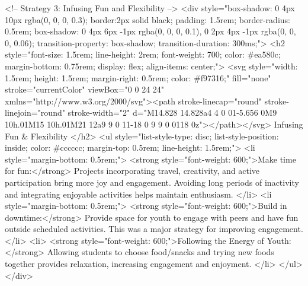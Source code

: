                 <!-- Strategy 3: Infusing Fun and Flexibility -->
                <div style="box-shadow: 0 4px 10px rgba(0, 0, 0, 0.3); border:2px solid black; padding: 1.5rem; border-radius: 0.5rem; box-shadow: 0 4px 6px -1px rgba(0, 0, 0, 0.1), 0 2px 4px -1px rgba(0, 0, 0, 0.06); transition-property: box-shadow; transition-duration: 300ms;">
                    <h2 style="font-size: 1.5rem; line-height: 2rem; font-weight: 700; color: #ea580c; margin-bottom: 0.75rem; display: flex; align-items: center;">
                        <svg style="width: 1.5rem; height: 1.5rem; margin-right: 0.5rem; color: #f97316;" fill="none" stroke="currentColor" viewBox="0 0 24 24" xmlns="http://www.w3.org/2000/svg"><path stroke-linecap="round" stroke-linejoin="round" stroke-width="2" d="M14.828 14.828a4 4 0 01-5.656 0M9 10h.01M15 10h.01M21 12a9 9 0 11-18 0 9 9 0 0118 0z"></path></svg>
                        Infusing Fun & Flexibility
                    </h2>
                    <ul style="list-style-type: disc; list-style-position: inside; color: #cccccc; margin-top: 0.5rem; line-height: 1.5rem;">
                        <li style="margin-bottom: 0.5rem;">
                            <strong style="font-weight: 600;">Make time for fun:</strong> Projects incorporating travel, creativity, and active participation bring more joy and engagement. Avoiding long periods of inactivity and integrating enjoyable activities helps maintain enthusiasm.
                        </li>
                        <li style="margin-bottom: 0.5rem;">
                            <strong style="font-weight: 600;">Build in downtime:</strong> Provide space for youth to engage with peers and have fun outside scheduled activities. This was a major strategy for improving engagement.
                        </li>
                        <li>
                            <strong style="font-weight: 600;">Following the Energy of Youth:</strong> Allowing students to choose food/snacks and trying new foods together provides relaxation, increasing engagement and enjoyment.
                        </li>
                    </ul>
                </div>

